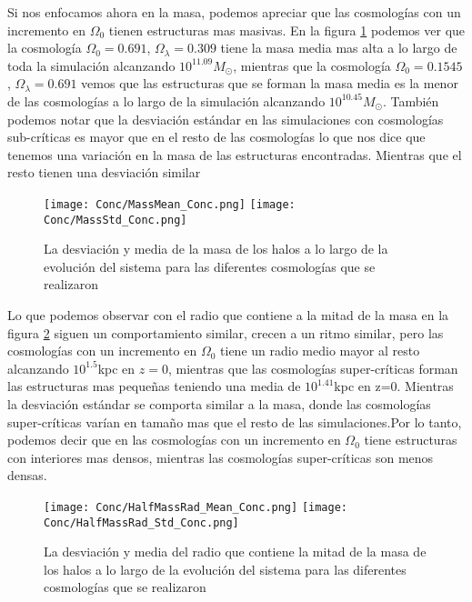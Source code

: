 Si nos enfocamos ahora en la masa, podemos apreciar que las cosmologías con un incremento en $\Omega_0$ tienen estructuras mas masivas. En la figura \ref{fig:Conc_Mass} podemos ver que la cosmología $\Omega_0=0.691$, $\Omega_\lambda=0.309$ tiene la masa media mas alta a lo largo de toda la simulación alcanzando $10^{11.09}M_\odot$, mientras que la cosmología $\Omega_0=0.1545$, $\Omega_\lambda=0.691$ vemos que las estructuras que se forman la masa media es la menor de las cosmologías a lo largo de la simulación alcanzando $10^{10.45} M_\odot$. También podemos notar que la desviación estándar en las simulaciones con cosmologías sub-críticas es mayor que en el resto de las cosmologías lo que nos dice que tenemos una variación en la masa de las estructuras encontradas. Mientras que el resto tienen una desviación similar 

\begin{figure}[H]
      \centering
      \texttt{[image: Conc/MassMean\_Conc.png]}
      \texttt{[image: Conc/MassStd\_Conc.png]}
      \caption[Evolución de la desviación y media de la masa de los halos para todas las cosmologías]{La desviación y media de la masa de los halos a lo largo de la evolución del sistema para las diferentes cosmologías que se realizaron}
      \label{fig:Conc_Mass}
\end{figure}

Lo que podemos observar con el radio que contiene a la mitad de la masa en la figura \ref{fig:Conc_HalfMassRad} siguen un comportamiento similar, crecen a un ritmo similar, pero las cosmologías con un incremento en $\Omega_0$ tiene un radio medio mayor al resto alcanzando $10^1.5$kpc en $z=0$, mientras que las cosmologías super-críticas forman las estructuras mas pequeñas teniendo una media de $10^1.41$kpc en z=0. Mientras la desviación estándar se comporta similar a la masa, donde las cosmologías super-críticas varían en tamaño mas que el resto de las simulaciones.Por lo tanto, podemos decir que en las cosmologías con un incremento en $\Omega_0$ tiene estructuras con interiores mas densos, mientras las cosmologías super-críticas son menos densas.

\begin{figure}[H]
      \centering
      \texttt{[image: Conc/HalfMassRad\_Mean\_Conc.png]}
      \texttt{[image: Conc/HalfMassRad\_Std\_Conc.png]}
      \caption[Evolución de la desviación y media del radio que contiene la mitad de la masa de los halos para todas las cosmologías]{La desviación y media del radio que contiene la mitad de la masa de los halos a lo largo de la evolución del sistema para las diferentes cosmologías que se realizaron}
      \label{fig:Conc_HalfMassRad}
\end{figure}

